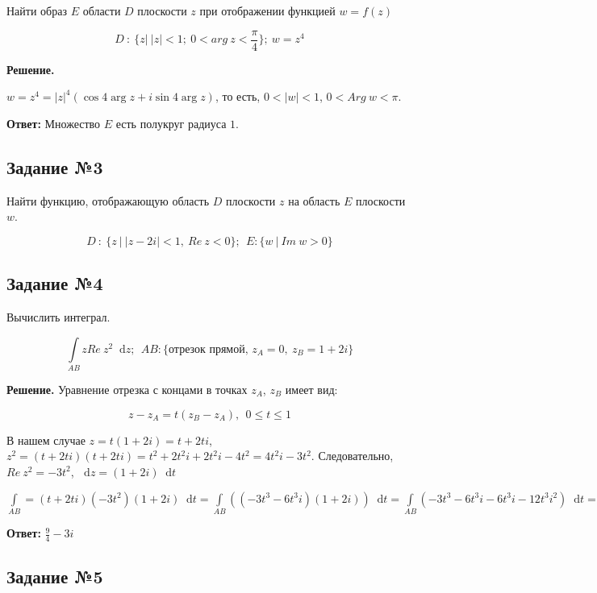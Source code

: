 \documentclass{article}
\newcommand*\diff{\mathop{}\!\mathrm{d}}
\begin{document}
Найти образ $E$ области $D$ плоскости $z$ при отображении функцией $w = f(z)$ 

$$
D \ : \ \{ z | \ |z| < 1; \ 0 < arg \ z < \frac{\pi}{4} \}; \ w = z^4
$$

\textbf{Решение.}

$w = z^4 = |z|^4 (\cos 4 \arg z + i \sin 4 \arg z)$, то есть, $0 < |w| < 1$, $0 < Arg \ w < \pi$.

\hfill

\textbf{Ответ:} Множество $E$ есть полукруг радиуса $1$.

\subsection{Задание №3}

Найти функцию, отображающую область $D$ плоскости $z$ на область $E$ плоскости $w$.

$$
D \ : \ \{ z \ | \ | z - 2 i | < 1, \ Re \ z < 0 \}; \ \ E: \{ w \ | \ Im \ w > 0 \}
$$

\subsection{Задание №4}

Вычислить интеграл.

$$
\int\limits_{A B} z Re \ z^2 \diff z; \ \ AB : \{ \text{отрезок прямой, } z_{A} = 0, \ z_{B} = 1 + 2 i \}
$$

\textbf{Решение.} Уравнение отрезка с концами в точках $z_{A}$, $z_{B}$ имеет вид:

$$
z - z_{A} = t (z_{B} - z_{A}), \ \ 0 \le t \le 1
$$

В нашем случае $z = t (1 + 2 i) = t + 2 t i$, $z^2 = (t + 2 t i) (t + 2 t i) = t^2 + 2t^2 i + 2 t^2 i - 4 t^2 = 4 t^2 i - 3 t^2$. Следовательно, $Re \ z^2 = - 3 t^2$, $\diff z = (1 + 2 i) \diff t$

$\int\limits_{A B} = (t + 2 t i) (-3 t^2) (1 + 2 i) \diff t = \int\limits_{A B} ((-3t^3 - 6 t^3 i) (1 + 2 i)) \diff t = \int\limits_{A B} (-3t^3 - 6 t^3 i - 6t^3 i - 12t^3 i^2) \diff t = \int\limits_{A B} (12 t^3 - 12 t^3 i - 3 t^3) \diff t =  (3 t^4 - 3i t^4 - \frac{3}{4} t^4) \bigg|_{0}^{1} = (\frac{9}{4} t^4 - 3 i t^4) \bigg|_{0}^{1} = \frac{9}{4} - 3 i$

\hfill

\textbf{Ответ:} $\frac{9}{4} - 3 i$

\subsection{Задание №5}
\end{document}
